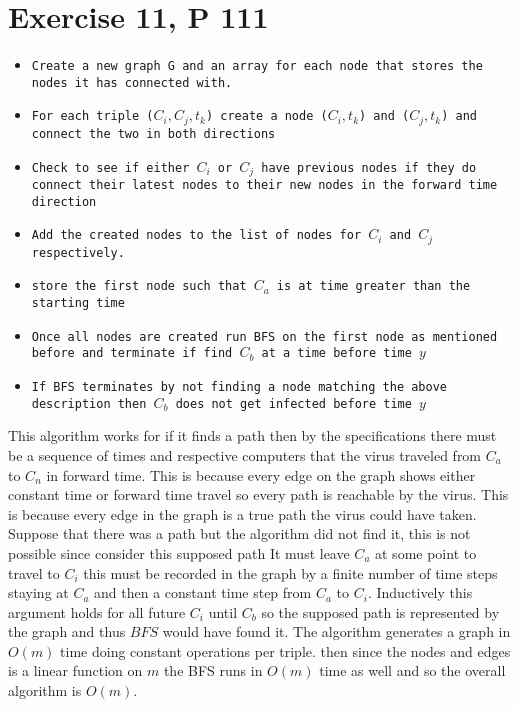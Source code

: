 \documentclass{amsart}
\begin{document}
\section{Exercise 11, P 111}


{\small
    \begin{itemize}
        \item \texttt{Create a new graph G and an array for each node that stores the nodes it has connected with.}
        \item \texttt{For each triple ($C_i,C_j,t_k$) create a node  ($C_i,t_k$) and ($C_j, t_k$) and connect the two in both directions}
        \item \texttt{Check to see if either $C_i$ or $C_j$ have previous nodes if they do connect their latest nodes to their new nodes in the forward time direction}
        \item \texttt{Add the created nodes to the list of nodes for $C_i$ and $C_j$ respectively.}
        \item \texttt{store the first node such that $C_a$ is at time greater than the starting time}
        \item \texttt{Once all nodes are created run BFS on the first node as mentioned before
            and terminate if find $C_b$ at a time before time $y$}
        \item \texttt{If BFS terminates by not finding a node matching the above description then  $C_b$ does not get infected before time $y$}
    \end{itemize}
}
This algorithm works for if it finds a path then by the specifications there must be a sequence of times and respective computers
that the virus traveled from $C_a$ to $C_ n$ in forward time. This is because every edge on the graph shows either
constant time or forward time travel so every path is reachable by the virus. This is because every edge in the graph is a true path the virus could have taken.
Suppose that there was a path but the algorithm did not find it, this is not possible since consider this supposed path
It must leave $C_a$ at some point to travel to $C_i$ this must be recorded in the graph by a finite number of time steps staying at $C_a$ and then
a constant time step from $C_a$ to $C_i$. Inductively this argument holds for all future $C_i$ until $C_b$ so the supposed path is represented by the graph and thus $BFS$ would
have found it.
The algorithm generates a graph in $O(m)$ time doing constant operations per triple. then since the nodes and edges is a linear function on $m$
the BFS runs in $O(m)$ time as well and so the overall algorithm is $O(m)$.
\end{document}
